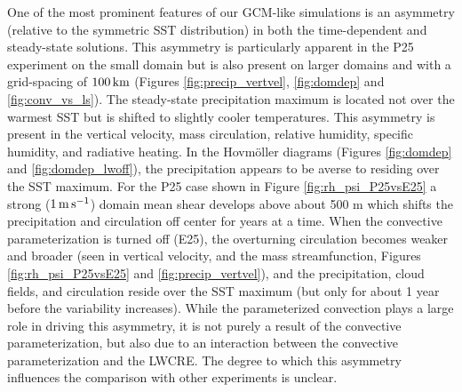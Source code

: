 \documentclass[draft]{agujournal2019}
\begin{document}
One of the most prominent features of our GCM-like simulations is an asymmetry (relative to the 
symmetric SST distribution) in both the time-dependent and steady-state solutions.  
This asymmetry is particularly apparent in the P25 experiment on the small domain but is also present on larger domains and 
with a grid-spacing of $100 \, \rm{km}$ (Figures  \ref{fig:precip_vertvel}, \ref{fig:domdep} and  \ref{fig:conv_vs_ls}). 
The steady-state precipitation maximum is located  not over the warmest SST but is shifted to slightly cooler temperatures.  
This asymmetry is present in the vertical velocity, mass circulation, relative humidity, specific humidity, and radiative heating.  
In the Hovm{\"o}ller diagrams (Figures \ref{fig:domdep} and \ref{fig:domdep_lwoff}), the precipitation appears to be averse 
to residing over the SST maximum.  
For the P25 case shown in Figure \ref{fig:rh_psi_P25vsE25} a strong ($1 \, \rm{m \, s^{-1}}$) domain
mean shear develops above about 500 m which shifts the precipitation and circulation off center for years at a time.  
When the convective parameterization is turned off (E25), the overturning circulation 
becomes weaker and broader (seen in vertical velocity, and the mass streamfunction, Figures \ref{fig:rh_psi_P25vsE25} and \ref{fig:precip_vertvel}), 
and the precipitation, cloud fields, and circulation reside over the SST maximum (but only for about 1 year before the variability 
increases).    
While the parameterized convection plays a large role in driving this asymmetry, it is not purely a 
result of the convective parameterization, but also due to an interaction between the convective 
parameterization and the LWCRE.   The degree to which this asymmetry influences the comparison with other 
experiments is unclear.     


\end{document}
